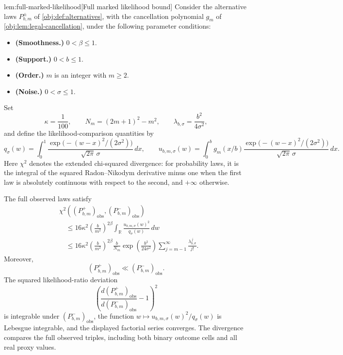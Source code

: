 \begin{lemmav}{lem:full-marked-likelihood}[Full marked likelihood bound]
Consider the alternative laws \(P^\pm_{b,m}\) of \cref{obj:def:alternatives}, with the cancellation polynomial \(g_m\) of \cref{obj:lem:legal-cancellation}, under the following parameter conditions:
\begin{itemize}
\item \textbf{(Smoothness.)} \(0<\beta\le1\).
\item \textbf{(Support.)} \(0<b\le1\).
\item \textbf{(Order.)} \(m\) is an integer with \(m\ge2\).
\item \textbf{(Noise.)} \(0<\sigma\le1\).
\end{itemize}
Set
\[
\kappa=\frac1{100},
\qquad
N_m=(2m+1)^2-m^2,
\qquad
\lambda_{b,\sigma}=\frac{b^2}{4\sigma^2},
\]
and define the likelihood-comparison quantities by
\[
q_\sigma(w)
=\int_0^1
\frac{\exp\!\bigl(-(w-x)^2/(2\sigma^2)\bigr)}
{\sqrt{2\pi}\,\sigma}\,dx,
\qquad
u_{b,m,\sigma}(w)
=\int_0^b g_m(x/b)
\frac{\exp\!\bigl(-(w-x)^2/(2\sigma^2)\bigr)}
{\sqrt{2\pi}\,\sigma}\,dx.
\]
Here \(\chi^2\) denotes the extended chi-squared divergence: for probability laws, it is the integral of the squared Radon--Nikodym derivative minus one when the first law is absolutely continuous with respect to the second, and \(+\infty\) otherwise.

The full observed laws satisfy
\[
\begin{aligned}
&\chi^2\!\left(
(P^+_{b,m})_{\mathrm{obs}},
(P^-_{b,m})_{\mathrm{obs}}
\right)\\
&\quad\le
16\kappa^2\left(\frac{b}{m^2}\right)^{2\beta}
\int_{\mathbb R}
\frac{u_{b,m,\sigma}(w)^2}{q_\sigma(w)}\,dw\\
&\quad\le
16\kappa^2\left(\frac{b}{m^2}\right)^{2\beta}
\frac{b}{N_m}
\exp\!\left(\frac{b^2}{24\sigma^2}\right)
\sum_{j=m-1}^{\infty}\frac{\lambda_{b,\sigma}^{\,j}}{j!}.
\end{aligned}
\]
Moreover,
\[
(P^+_{b,m})_{\mathrm{obs}}
\ll
(P^-_{b,m})_{\mathrm{obs}}.
\]
The squared likelihood-ratio deviation
\[
\left(
\frac{d(P^+_{b,m})_{\mathrm{obs}}}
{d(P^-_{b,m})_{\mathrm{obs}}}-1
\right)^2
\]
is integrable under \((P^-_{b,m})_{\mathrm{obs}}\), the function
\(w\mapsto u_{b,m,\sigma}(w)^2/q_\sigma(w)\) is Lebesgue integrable, and the displayed factorial series converges. The divergence compares the full observed triples, including both binary outcome cells and all real proxy values.
\end{lemmav}

